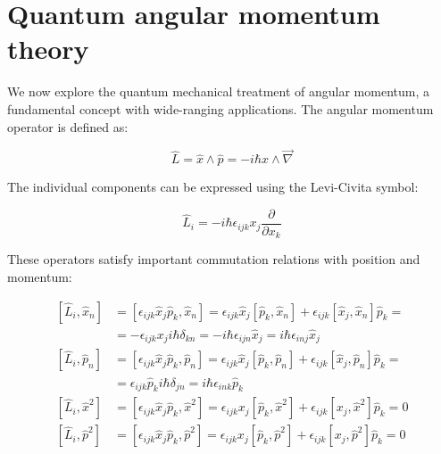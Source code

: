 \chapter{Quantum angular momentum theory}
We now explore the quantum mechanical treatment of angular momentum, a fundamental concept with wide-ranging applications. The angular momentum operator is defined as:

\begin{equation}
\hat{L}=\hat{x} \wedge \hat{p}=-i \hbar x \wedge \vec{\nabla}
\end{equation}

The individual components can be expressed using the Levi-Civita symbol:

\begin{equation}
\hat{L}_{i}=-i \hbar \epsilon_{i j k} x_{j} \frac{\partial}{\partial x_{k}}
\end{equation}

These operators satisfy important commutation relations with position and momentum:

\begin{align}
{\left[\hat{L}_{i}, \hat{x}_{n}\right] } & =\left[\epsilon_{i j k} \hat{x}_{j} \hat{p}_{k}, \hat{x}_{n}\right]=\epsilon_{i j k} \hat{x}_{j}\left[\hat{p}_{k}, \hat{x}_{n}\right]+\epsilon_{i j k}\left[\hat{x}_{j}, \hat{x}_{n}\right] \hat{p}_{k}= \\
& =-\epsilon_{i j k} x_{j} i \hbar \delta_{k n}=-i \hbar \epsilon_{i j n} \hat{x}_{j}=i \hbar \epsilon_{i n j} \hat{x}_{j}  \\
{\left[\hat{L}_{i}, \hat{p}_{n}\right] } & =\left[\epsilon_{i j k} \hat{x}_{j} \hat{p}_{k}, \hat{p}_{n}\right]=\epsilon_{i j k} \hat{x}_{j}\left[\hat{p}_{k}, \hat{p}_{n}\right]+\epsilon_{i j k}\left[\hat{x}_{j}, \hat{p}_{n}\right] \hat{p}_{k}= \\
& =\epsilon_{i j k} \hat{p}_{k} i \hbar \delta_{j n}=i \hbar \epsilon_{i n k} \hat{p}_{k}  \\
{\left[\hat{L}_{i}, \hat{x}^{2}\right] } & =\left[\epsilon_{i j k} \hat{x}_{j} \hat{p}_{k}, \hat{x}^{2}\right]=\epsilon_{i j k} x_{j}\left[\hat{p}_{k}, \hat{x}^{2}\right]+\epsilon_{i j k}\left[x_{j}, \hat{x}^{2}\right] \hat{p}_{k}=0  \\
{\left[\hat{L}_{i}, \hat{p}^{2}\right] } & =\left[\epsilon_{i j k} \hat{x}_{j} \hat{p}_{k}, \hat{p}^{2}\right]=\epsilon_{i j k} x_{j}\left[\hat{p}_{k}, \hat{p}^{2}\right]+\epsilon_{i j k}\left[x_{j}, \hat{p}^{2}\right] \hat{p}_{k}=0
\end{align}

